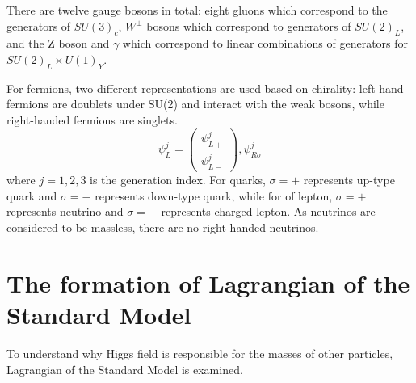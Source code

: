 \par There are twelve gauge bosons in total: eight gluons which correspond to the generators of $SU(3)_c$, $W^{\pm}$ bosons which correspond to generators of $SU(2)_L$, and the Z boson and $\gamma$ which correspond to linear combinations of generators for $SU(2)_L \times U(1)_Y$.

\par For fermions, two different representations are used based on chirality: left-hand fermions are doublets under SU(2) and interact with the weak bosons, while right-handed fermions are singlets.
\begin{equation}
  \psi_L^{j}=\left( \begin{smallmatrix} \psi_{L+}^{j}\\ \psi_{L-}^{j} \end{smallmatrix}\right),  \psi_{R\sigma}^{j}
  \label{eq:fermion}
\end{equation}
where $j=1,2,3$ is the generation index. For quarks, $\sigma=+$ represents up-type quark and $\sigma=-$ represents down-type quark, while for of lepton, $\sigma=+$ represents neutrino and $\sigma=-$ represents charged lepton. As neutrinos are considered to be massless, there are no right-handed neutrinos.

\section{The formation of Lagrangian of the Standard Model}
\par To understand why Higgs field is responsible for the masses of other particles, Lagrangian of the Standard Model is examined.

